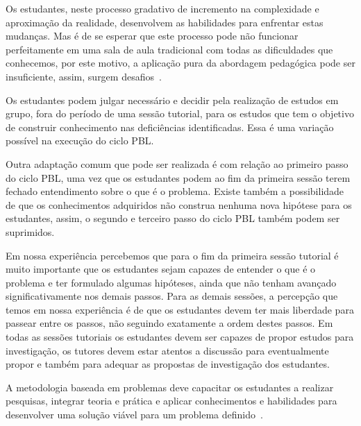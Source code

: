 Os estudantes, neste processo gradativo de incremento
na complexidade e aproximação da realidade, desenvolvem
as habilidades para enfrentar estas mudanças.
Mas é de se esperar que este processo pode não
funcionar perfeitamente em uma sala de aula
tradicional com todas as dificuldades que conhecemos,
por este motivo, a aplicação pura da abordagem pedagógica
pode ser insuficiente, assim, surgem
desafios~\cite{fee2010teaching}.


Os estudantes podem julgar necessário e decidir
pela realização de estudos em grupo,
fora do período de uma sessão tutorial, para
os estudos que tem o objetivo de construir
conhecimento nas deficiências identificadas.
Essa é uma variação possível na execução
do ciclo \ac{PBL}.

Outra adaptação comum que pode ser realizada
é com relação ao primeiro passo do ciclo \ac{PBL},
uma vez que os estudantes podem ao fim
da primeira sessão terem fechado
entendimento sobre o que é o problema.
Existe também a possibilidade de que os
conhecimentos adquiridos não construa nenhuma
nova hipótese para os estudantes, assim, o segundo
e terceiro passo do ciclo \ac{PBL} também podem ser
suprimidos.

Em nossa experiência percebemos que para o
fim da primeira sessão tutorial é muito importante
que os estudantes sejam capazes de entender
o que é o problema e ter formulado algumas
hipóteses, ainda que não tenham avançado
significativamente nos demais passos.
Para as demais sessões, a percepção
que temos em nossa experiência é de
que os estudantes devem ter mais
liberdade para passear entre os passos,
não seguindo exatamente a ordem destes passos.
Em todas as sessões tutoriais os estudantes
devem ser capazes de propor estudos
para investigação, os tutores devem
estar atentos a discussão para
eventualmente propor e também para
adequar as propostas de investigação
dos estudantes.

A metodologia baseada em problemas deve capacitar os estudantes a
realizar pesquisas, integrar teoria e prática e aplicar conhecimentos
e habilidades para desenvolver uma solução viável para
um problema definido~\cite{savery2015overview}.


